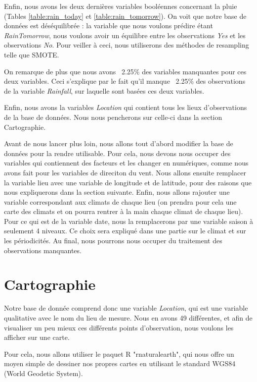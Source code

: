 \documentclass{article}
\begin{document}
Enfin, nous avons les deux dernières variables booléennes concernant la pluie (Tables \ref{table:rain_today} et \ref{table:rain_tomorrow}). On voit que notre base de données est déséquilibrée : la variable que nous voulons prédire étant \emph{RainTomorrow}, nous voulons avoir un équilibre entre les observations \emph{Yes} et les observations \emph{No}. Pour veiller à ceci, nous utiliserons des méthodes de resampling telle que SMOTE. 

On remarque de plus que nous avons ~2.25\% des variables manquantes pour ces deux variables. Ceci s'explique par le fait qu'il manque ~2.25\% des observations de la variable \emph{Rainfall}, sur laquelle sont basées ces deux variables.

Enfin, nous avons la variables \emph{Location} qui contient tous les lieux d'observations de la base de données. Nous nous pencherons sur celle-ci dans la section Cartographie. 

Avant de nous lancer plus loin, nous allons tout d'abord modifier la base de données pour la rendre utilisable. Pour cela, nous devons nous occuper des variables qui contiennent des facteurs et les changer en numériques, comme nous avons fait pour les variables de direciton du vent. Nous allons ensuite remplacer la variable lieu avec une variable de longitude et de latitude, pour des raisons que nous expliquerons dans la section suivante. Enfin, nous allons rajouter une variable correspondant aux climats de chaque lieu (on prendra pour cela une carte des climats et on pourra rentrer à la main chaque climat de chaque lieu). Pour ce qui est de la variable date, nous la remplacerons par une variable saison à seulement 4 niveaux. Ce choix sera expliqué dans une partie sur le climat et sur les périodicités. Au final, nous pourrons nous occuper du traitement des observations manquantes. 

\section{Cartographie}

Notre base de donnée comprend donc une variable \emph{Location}, qui est une variable qualitative avec le nom du lieu de mesure. Nous en avons 49 différentes, et afin de visualiser un peu mieux ces différents points d'observation, nous voulons les afficher sur une carte. 

Pour cela, nous allons utiliser le paquet R "rnaturalearth", qui nous offre un moyen simple de dessiner nos propres cartes en utilisant le standard WGS84 (World Geodetic System).
\end{document}
